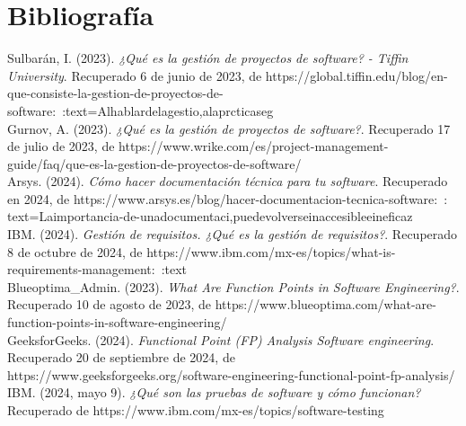 \documentclass[12pt,letterpaper,spanish, xcolor=table]{report}
\numberwithin{figure}{subsection}
\begin{document}
\newpage
\appendix
	
%

	
	




\newpage
\chapter{Bibliografía}

	Sulbarán, I. (2023). \textit{¿Qué es la gestión de proyectos de software? - Tiffin University}. Recuperado 6 de junio de 2023, de https://global.tiffin.edu/blog/en-que-consiste-la-gestion-de-proyectos-de-software:~:text=Alhablardelagestio,alaprcticaseg\\
	
	Gurnov, A. (2023). \textit{¿Qué es la gestión de proyectos de software?}. Recuperado 17 de julio de 2023, de https://www.wrike.com/es/project-management-guide/faq/que-es-la-gestion-de-proyectos-de-software/\\
	
	Arsys. (2024). \textit{Cómo hacer documentación técnica para tu software}. Recuperado en 2024, de https://www.arsys.es/blog/hacer-documentacion-tecnica-software:~:
	text=Laimportancia-de-unadocumentaci,puedevolverseinaccesibleeineficaz\\
	
	IBM. (2024). \textit{Gestión de requisitos. ¿Qué es la gestión de requisitos?}. Recuperado 8 de octubre de 2024, de https://www.ibm.com/mx-es/topics/what-is-requirements-management:~:text\\
	
	Blueoptima\_Admin. (2023). \textit{What Are Function Points in Software Engineering?}. Recuperado 10 de agosto de 2023, de https://www.blueoptima.com/what-are-function-points-in-software-engineering/\\
	
	GeeksforGeeks. (2024). \textit{Functional Point (FP) Analysis Software engineering}. Recuperado 20 de septiembre de 2024, de https://www.geeksforgeeks.org/software-engineering-functional-point-fp-analysis/\\
	
	IBM. (2024, mayo 9). \textit{¿Qué son las pruebas de software y cómo funcionan?} Recuperado de https://www.ibm.com/mx-es/topics/software-testing\\
	
\end{document}
